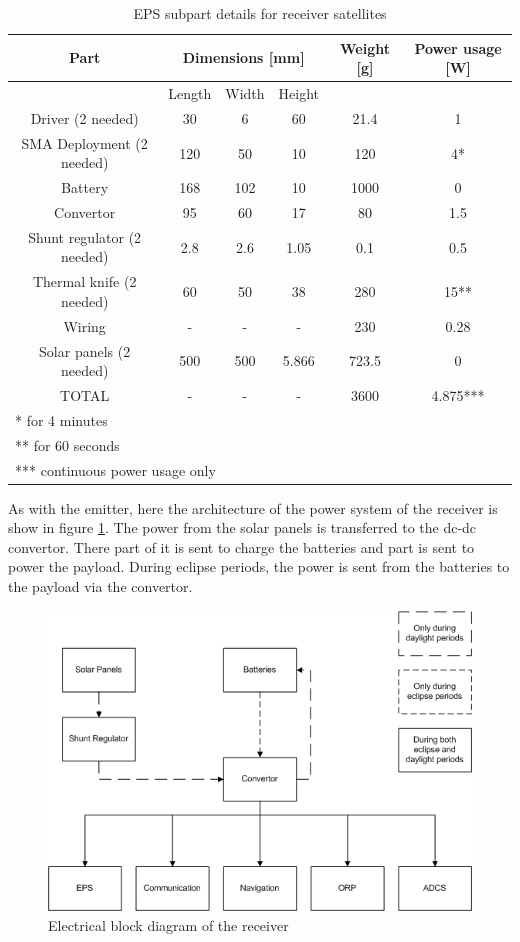 \begin{table}[H!]
\centering
\begin{tabular}{cccccc}
\toprule
Part & \multicolumn{3}{c}{Dimensions [mm]} & Weight [g] & Power usage [W]\\ 
\midrule
 & Length & Width & Height & & \\ 
 Driver (2 needed) & 30 & 6 & 60 & 21.4 & 1 \\ 
 SMA Deployment (2 needed) & 120 & 50 & 10 & 120 & 4* \\ 
 Battery & 168 & 102 & 10 & 1000 & 0 \\ 
 Convertor & 95 & 60 & 17 & 80 & 1.5 \\ 
 Shunt regulator  (2 needed) & 2.8 & 2.6 & 1.05 & 0.1 & 0.5 \\ 
 Thermal knife (2 needed) & 60 & 50 & 38 & 280 & 15**  \\
 Wiring & - & - & - & 230 & 0.28 \\ 
 Solar panels (2 needed) & 500 & 500 & 5.866 & 723.5 & 0 \\
 \midrule
 TOTAL & - & - & - & 3600 & 4.875***  \\ 
\bottomrule
 \multicolumn{6}{l}{* for 4 minutes} \\
 \multicolumn{6}{l}{** for 60 seconds} \\
 \multicolumn{6}{l}{*** continuous power usage only} \\
\end{tabular}
\caption{EPS subpart details for receiver satellites}
\label{tab:EPS_detailsRec}
\end{table}


As with the emitter, here the architecture of the power system of the receiver is show in figure \ref{fig:receiver_block}. The power from the solar panels is transferred to the dc-dc convertor. There part of it is sent to charge the batteries and part is sent to power the payload. During eclipse periods, the power is sent from the batteries to the payload via the convertor.

\begin{figure}[H!]
\centering
\includegraphics{chapters/img/EPS_receiver_block_diagram.png}
\caption{Electrical block diagram of the receiver}
\label{fig:receiver_block}
\end{figure}